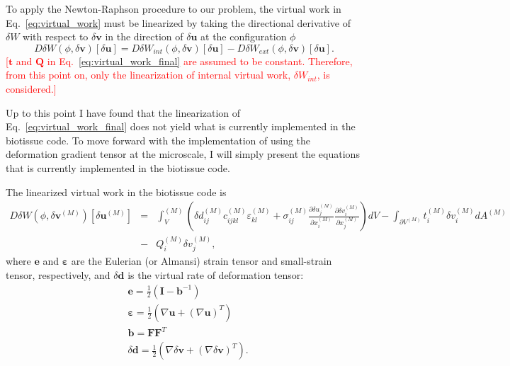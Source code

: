 \documentclass[12pt,aps,pre]{revtex4}
\newcommand{\red}[1]{\textcolor{red}{[#1]}}
\begin{document}
To apply the Newton-Raphson procedure to our problem, the virtual work in Eq.\ \eqref{eq:virtual_work} must be linearized by taking the directional derivative of $\delta W$ with respect to $\delta \pmb{v}$ in the direction of $\delta \pmb{u}$ at the configuration $\phi$
%
\begin{equation}
D\delta W (\phi,\delta \pmb{v}) [\delta \pmb{u}] = D\delta W_{int} (\phi,\delta \pmb{v}) [\delta \pmb{u}] - D\delta W_{ext} (\phi,\delta \pmb{v}) [\delta \pmb{u}].
\end{equation}
%
%
\red{$\pmb{t}$ and $\pmb{Q}$ in Eq.\ \eqref{eq:virtual_work_final} are assumed to be constant. Therefore, from this point on, only the linearization of internal virtual work, $\delta W_{int}$, is considered.} 

Up to this point I have found that the linearization of Eq.\ \eqref{eq:virtual_work_final} does not yield what is currently implemented in the biotissue code. To move forward with the implementation of using the deformation gradient tensor at the microscale, I will simply present the equations that is currently implemented in the biotissue code.

The linearized virtual work in the biotissue code is
%
\begin{eqnarray}
D\delta W(\phi,\delta \pmb{v}^{(M)})[\delta \pmb{u}^{(M)}]  
%
&=& \int_V^{(M)} \left(\delta d_{ij}^{(M)} c_{ijkl}^{(M)} \varepsilon_{kl}^{(M)} +  \sigma_{ij}^{(M)} \frac{\partial \delta u_j^{(M)}}{\partial x_i^{(M)}}\frac{\partial \delta v_i^{(M)}}{\partial x_j^{(M)}}\right) d V - \int_{\partial V^{(M)}} t_i^{(M)} \delta v_i^{(M)} dA^{(M)} \nonumber\\
&-& Q_i^{(M)} \delta v_j^{(M)},
\label{eq:virtual_work_linearized}
\end{eqnarray}
%
where $\pmb{e}$ and $\pmb{\varepsilon}$ are the Eulerian (or Almansi) strain tensor and small-strain tensor, respectively, and $\delta \pmb{d}$ is the virtual rate of deformation tensor:
%
\begin{align}
&\pmb{e} = \frac{1}{2}(\pmb{I} - \pmb{b}^{-1}) \nonumber\\
%
&\pmb{\varepsilon} = \frac{1}{2}\left(\nabla \pmb{u} + (\nabla \pmb{u})^T\right) \nonumber\\
%
&\pmb{b} = \pmb{F}\pmb{F}^T \\
%
&\delta \pmb{d} = \frac{1}{2}\left(\nabla \delta \pmb{v}  + (\nabla \delta \pmb{v})^T\right).
\end{align}
%
\end{document}
